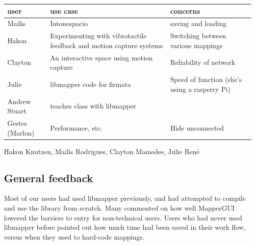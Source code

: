 

\begin{table}
\begin{center}
\begin{tabular}{l p{5cm} p{5cm}}
	\hline\hline
	user&use case&concerns\\
	\hline
	Mailis&Intonespacio&saving and loading\\
	Hakon&Experimenting with vibrotactile feedback and motion capture systems&Switching between various mappings\\
	Clayton&An interactive space using motion capture&Reliability of network\\
	Julie&libmapper code for firmata&Speed of function (she's using a rasperry Pi)\\
	\hline
	Andrew Stuart&teaches class with libmapper&\\
	Gestes (Marlon)&Performance, etc.&Hide unconnected\\
\end{tabular}
\end{center}	
\end{table}

Hakon Knutzen, Mailis Rodrigues, Clayton Mamedes, Julie Ren\'e


	\subsection{General feedback} %
	\label{sub:general_feedback}

Most of our users had used libmapper previously, and had attempted to compile and use the library from scratch. Many commented on how well MapperGUI lowered the barriers to entry for non-technical users. Users who had never used libmapper before pointed out how much time had been saved in their work flow, versus when they used to hard-code mappings.

